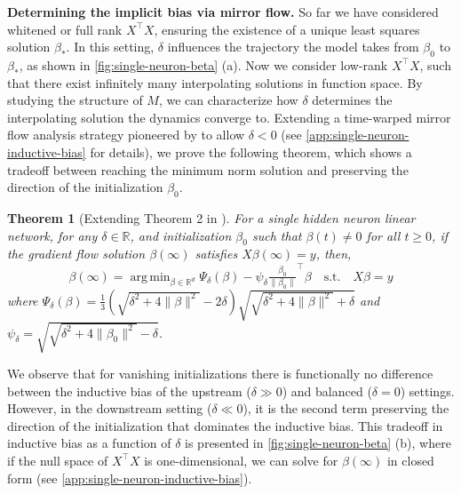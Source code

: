 \documentclass{article}
\theoremstyle{plain}
\newtheorem{theorem}{Theorem}[section]
\theoremstyle{definition}
\theoremstyle{remark}
\DeclareMathOperator*{\argmin}{arg\,min}
\begin{document}
\textbf{Determining the implicit bias via mirror flow.}
%
So far we have considered whitened or full rank $X^\intercal X$, ensuring the existence of a unique least squares solution $\beta_*$.
%
In this setting, $\delta$ influences the trajectory the model takes from $\beta_0$ to $\beta_*$, as shown in \cref{fig:single-neuron-beta} (a).
%
Now we consider low-rank $X^\intercal X$, such that there exist infinitely many interpolating solutions in function space.
%
By studying the structure of $M$, we can characterize how $\delta$ determines the interpolating solution the dynamics converge to.
%
Extending a time-warped mirror flow analysis strategy pioneered by \citet{azulay2021implicit} to allow $\delta < 0$ (see \cref{app:single-neuron-inductive-bias} for details), we prove the following theorem, which shows a tradeoff between reaching the minimum norm solution and preserving the direction of the initialization $\beta_0$.
\begin{theorem} [Extending Theorem 2 in \citet{azulay2021implicit}]
    \label{thrm:single-neuron-implicit-bias}
    For a single hidden neuron linear network, for any $\delta \in \mathbb{R}$, and initialization $\beta_0$ such that $\beta(t) \neq 0$ for all $t \ge 0$, if the gradient flow solution $\beta(\infty)$ satisfies $X \beta(\infty) = y$, then,
    \begin{equation}
        \beta(\infty) = \argmin_{\beta \in \mathbb{R}^d} \Psi_\delta(\beta) - \psi_\delta \tfrac{\beta_0}{\|\beta_0\|}^\intercal \beta \quad \mathrm{s.t.} \quad X \beta = y
    \end{equation}
    where $\Psi_\delta(\beta) = \frac{1}{3}\left(\sqrt{\delta^2 + 4\|\beta\|^2} - 2\delta\right)\sqrt{\sqrt{\delta^2 + 4\|\beta\|^2} + \delta}$ and $\psi_\delta = \sqrt{\sqrt{\delta^2 + 4\|\beta_0\|^2} - \delta}$.
\end{theorem}
We observe that for vanishing initializations there is functionally no difference between the inductive bias of the upstream ($\delta \gg 0$) and balanced ($\delta = 0$) settings.
%
However, in the downstream setting ($\delta \ll 0$), it is the second term preserving the direction of the initialization that dominates the inductive bias.
%
This tradeoff in inductive bias as a function of $\delta$ is presented in \cref{fig:single-neuron-beta} (b), where if the null space of $X^\intercal X$ is one-dimensional, we can solve for $\beta(\infty)$ in closed form (see \cref{app:single-neuron-inductive-bias}).
\end{document}
